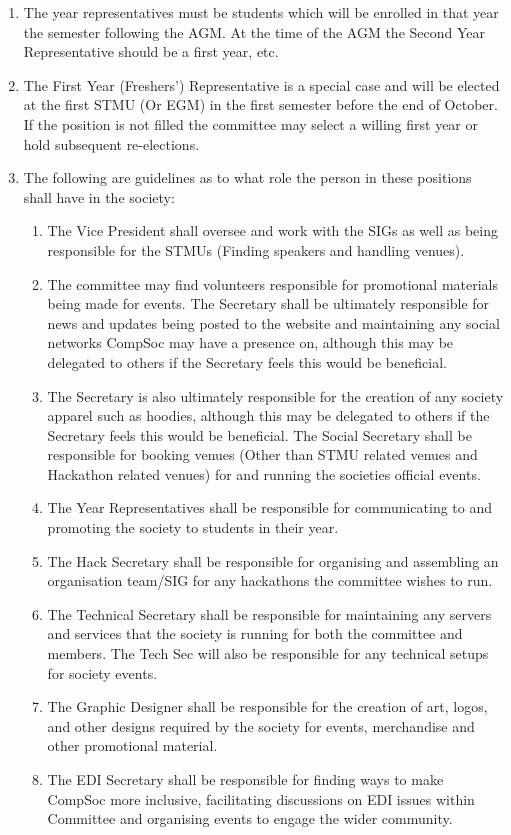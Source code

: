 \begin {enumerate}
  \item The year representatives must be students which will be enrolled in that year the semester
    following the AGM. At the time of the AGM the Second Year Representative should be a first year, etc.

  \item The First Year (Freshers') Representative is a special case and will be elected at the first STMU (Or EGM)
    in the first semester before the end of October. If the position is not filled the committee may select a
    willing first year or hold subsequent re-elections.

  \item The following are guidelines as to what role the person in these positions shall have in the society:
    \begin{enumerate}
      \item The Vice President shall oversee and work with the SIGs as well as
        being responsible for the STMUs (Finding speakers and handling venues).
      \item The committee may find volunteers responsible for promotional materials
        being made for events. The Secretary shall be ultimately
        responsible for news and updates being posted to the website and
        maintaining any social networks CompSoc may have a presence on,
        although this may be delegated to others if the Secretary feels this
        would be beneficial.
      \item The Secretary is also ultimately responsible for the creation of any
        society apparel such as hoodies, although this may be delegated to others
        if the Secretary feels this would be beneficial. The Social Secretary
        shall be responsible for booking venues (Other than STMU related venues
        and Hackathon related venues) for and running the societies
        official events.
      \item The Year Representatives shall be responsible for communicating to
        and promoting the society to students in their year.
      \item The Hack Secretary shall be responsible for organising and assembling
        an organisation team/SIG for any hackathons the committee wishes to run.
      \item The Technical Secretary shall be responsible for maintaining any servers
        and services that the society is running for both the committee and members.
        The Tech Sec will also be responsible for any technical setups for society events.
      \item The Graphic Designer shall be responsible for the creation of art, logos, 
        and other designs required by the society for events, merchandise and other promotional material.  
      \item The EDI Secretary shall be responsible for finding ways to make CompSoc more inclusive, facilitating 
      discussions on EDI issues within Committee and organising events to engage the wider community.
    \end{enumerate}


\end{enumerate}
